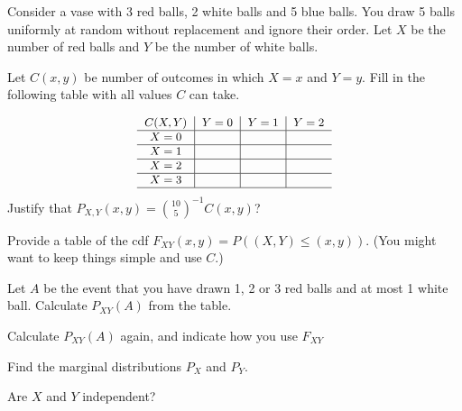 \documentclass[a4paper,10pt,landscape,twocolumn]{scrartcl}
\begin{document}
\begin{exercise}[4pt]
	Consider a vase with 3 red balls, 2 white balls and 5 blue balls. You draw 5 balls uniformly at random without replacement and ignore their order. Let $X$ be the number of red balls and $Y$ be the number of white balls.
	
	\begin{subex}[1pt]
		Let $C(x,y)$ be 	number of outcomes in which $X=x$ and $Y=y$. Fill in the following table with all values $C$ can take. 
		
			\[\small{
	\begin{tabular}{c|c|c|c}
	$C(X,Y)$&$Y=0$	&$Y=1$	&$Y=2$\\\hline
	$X=0$	&		&		&\\\hline
	$X=1$	&		&		&\\\hline
	$X=2$	&		&		&\\\hline
	$X=3$	&		&		&\\\hline
	\end{tabular}}
	\]
	Justify that $P_{X,Y}(x,y) = {10 \choose 5}^{-1} C(x,y)$?
	\end{subex}
	
	\begin{subex}[1pt]
		Provide a table of the cdf $F_{XY}(x,y) = P((X,Y) \le (x,y))$. (You might want to keep things simple and use $C$.)	
	\end{subex}
	
	\begin{subex}[0.5pt]
		Let $A$ be the event that you have drawn 1, 2 or 3 red balls and at most 1 white ball. Calculate $P_{XY}(A)$ from the table.
	\end{subex}
	
	\begin{subex}[0.5pt]
	Calculate $P_{XY}(A)$ again, and indicate how you use $F_{XY}$	
	\end{subex}

	
	\begin{subex}[0.5pt]
	Find the marginal distributions $P_X$ and $P_Y$.	
	\end{subex}
	
	\begin{subex}[0.5pt]
	Are $X$ and $Y$ independent?	
	\end{subex}
\end{exercise}
\end{document}
